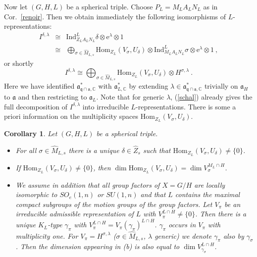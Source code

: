\documentclass[10]{amsart}
\newtheorem{cor}[thm]{Corollary}
\theoremstyle{remark}
\theoremstyle{definition}
\numberwithin{equation}{section}
\newcommand{\e}{\text{e}}               %
\newcommand{\C}{\mathbb{C}}           %
\newcommand{\Hom}{\mathrm{Hom}}
\newcommand{\Ind}{\text{Ind}}
\newcommand{\fa}{{\mathfrak a}}             %
\newcommand{\fq}{{\mathfrak q}}
\newcommand{\fs}{{\mathfrak s}}
\newcommand{\be}{\begin{equation}}
\begin{document}
{Now let $(G,H,L)$ be a spherical triple. Choose $P_L=M_LA_LN_L$ as in Cor.~\ref{renoir}. Then we obtain immediately the following isomorphisms of $L$-representations:
\begin{eqnarray*}
I^{\delta,\lambda}&\cong& \Ind_{Z_LA_LN_L}^{L}\delta\otimes\e^{\lambda}\otimes 1 \\
&\cong& \bigoplus_{\sigma\in \widehat M_{L,s}} \Hom_{Z_L}(V_\sigma,U_\delta) \otimes \Ind_{M_LA_LN_L}^{L}\sigma\otimes\e^{\lambda}\otimes 1\ ,
\end{eqnarray*}
or shortly
\be\label{schal}
I^{\delta,\lambda}\cong \bigoplus_{\sigma\in \widehat M_{L,s}} \Hom_{Z_L}(V_\sigma,U_\delta) \otimes H^{\sigma,\lambda}\ .
\end{equation}
Here we have identified $ \fa_{\fq\cap\fs,\C}^*$ with  $\fa_{L,\C}^*$ by extending $\lambda\in  \fa_{\fq\cap\fs,\C}^*$ trivially on $ \fa_{H}$ to  $\fa$
and then restricting to $\fa_L$. Note that for generic $\lambda$, (\ref{schal}) already gives the full decomposition of $I^{\delta,\lambda}$ into irreducible $L$-representations.
There is some a priori information on the multiplicity spaces $\Hom_{Z_L}(V_\sigma,U_\delta)$.

\begin{cor}\label{wels}
Let $(G,H,L)$ be a spherical triple.
\begin{itemize}
\item[(a)] For all $\sigma\in\widehat M_{L,s}$ there is a unique $\delta\in \widehat Z_{s}$ such that $\Hom_{Z_L}(V_\sigma,U_\delta)\ne\{0\}$.
\item[(b)] If $\Hom_{Z_L}(V_\sigma,U_\delta)\ne\{0\}$, then 
$\dim\Hom_{Z_L}(V_\sigma,U_\delta)=\dim V_\sigma^{M_L\cap H}$.
\item[(c)] We assume in addition that all group factors of $X=G/H$ are locally isomorphic to $SO_e(1,n)$ or $SU(1,n)$ and that $L$ contains the maximal compact subgroups of the
motion groups of the group factors. Let $V_\pi$ be an irreducible admissible representation of $L$ with $V_\pi^{L\cap H}\ne\{0\}$. Then there is a unique $K_L$-type $\gamma_\pi$ with $V_\pi^{L\cap H}=V_\pi(\gamma_\pi)^{L\cap H}$.
$\gamma_\pi$ occurs in $V_\pi$ with multiplicity one. For $V_\pi=H^{\sigma,\lambda}$ ($\sigma\in\widehat M_{L,s}$, $\lambda$ generic) we denote $\gamma_\pi$ also by $\gamma_\sigma$.
Then the dimension appearing in (b) is also equal to $\dim V_{\gamma_\sigma}^{L\cap H}$.
\end{itemize}
\end{cor} 

}
\end{document}
